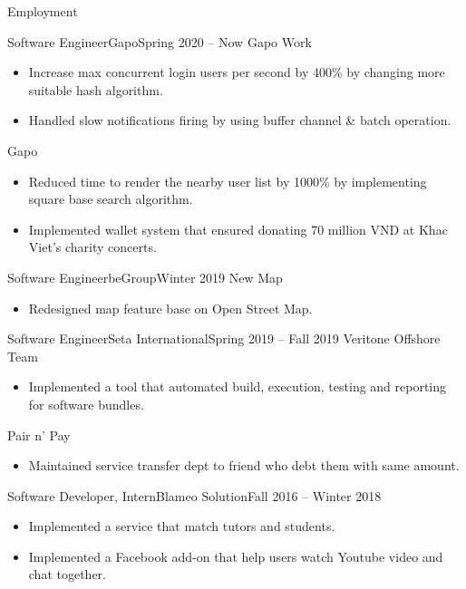 \documentclass[]{mcdowellcv}
\begin{document}
	\makeheader
	
	\begin{cvsection}{Employment}
		\begin{cvsubsection}{Software Engineer}{Gapo}{Spring 2020 -- Now}	
			Gapo Work 		
			\begin{itemize}
				\item Increase max concurrent login users per second by 400\% by changing more suitable hash algorithm.
				\item Handled slow notifications firing by using buffer channel \& batch operation.
			\end{itemize}
			Gapo 		
			\begin{itemize}
				\item Reduced time to render the nearby user list by 1000\% by implementing square base search algorithm.
				\item Implemented wallet system that ensured donating 70 million VND at Khac Viet's charity concerts.
			\end{itemize}
		\end{cvsubsection}
		
		\begin{cvsubsection}{Software Engineer}{beGroup}{Winter 2019}
			New Map	
			\begin{itemize}
				\item Redesigned map feature base on Open Street Map.
			\end{itemize}
		\end{cvsubsection}

		\begin{cvsubsection}{Software Engineer}{Seta International}{Spring 2019 -- Fall 2019}
			Veritone Offshore Team	
			\begin{itemize}
				\item Implemented a tool that automated build, execution, testing and reporting for software bundles.
			\end{itemize}
			Pair n' Pay	
			\begin{itemize}
				\item Maintained service transfer dept to friend who debt them with same amount.
			\end{itemize}
		\end{cvsubsection}

		\begin{cvsubsection}{Software Developer, Intern}{Blameo Solution}{Fall 2016 -- Winter 2018}	
			\begin{itemize}
				\item Implemented a service that match tutors and students.
				\item Implemented a Facebook add-on that help users watch Youtube video and chat together.
				 

\end{itemize}
\end{cvsubsection}
\end{cvsection}
\end{document}
